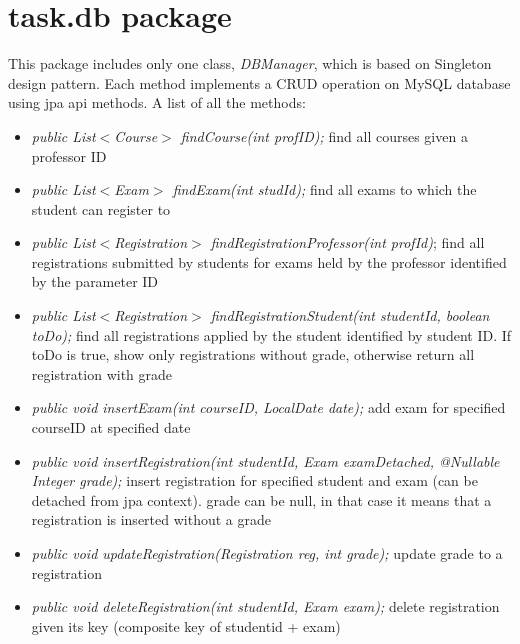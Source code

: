\documentclass{report}
\begin{document}
\section*{task.db package}
This package includes only one class, \textit{DBManager}, which is based on Singleton design pattern. Each method implements a CRUD operation on MySQL database using jpa api methods. A list of all the methods:
\begin{itemize}
	\item \textit{public List\(<\)Course\(>\) findCourse(int profID);} \newline find all courses given a professor ID
	\item \textit{public List\(<\)Exam\(>\) findExam(int studId);} \newline find all exams to which the student can register to 
	\item \textit{public List\(<\)Registration\(>\) findRegistrationProfessor(int profId)}; \newline find all registrations submitted by students for exams held by the professor identified by the parameter ID
	\item \textit{public List\(<\)Registration\(>\) findRegistrationStudent(int studentId, boolean toDo);} \newline find all registrations applied by the student identified by student ID. If toDo is true, show only registrations without grade, otherwise return all registration with grade
	\item \textit{public void insertExam(int courseID, LocalDate date);} \newline add exam for specified courseID at specified date
	\item \textit{public void insertRegistration(int studentId, Exam examDetached, @Nullable Integer grade);} \newline insert registration for specified student and exam (can be detached from jpa context). grade can be null, in that case it means that a registration is inserted without a grade
	\item \textit{public void updateRegistration(Registration reg, int grade);} \newline update grade to a registration
	\item \textit{public void deleteRegistration(int studentId, Exam exam);} \newline delete registration given its key (composite key of studentid + exam)
\end{itemize}
\end{document}
